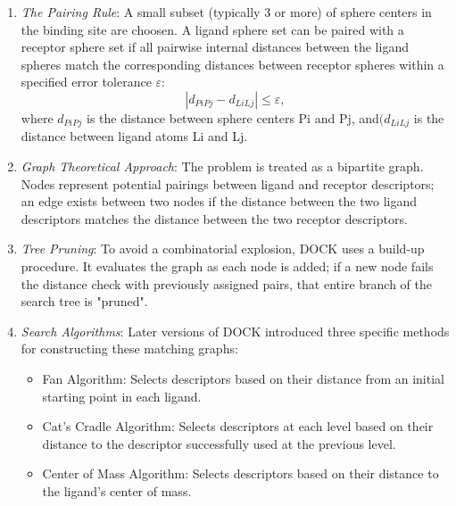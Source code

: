 \documentclass[12pt, a4paper]{article}
\begin{document}
\begin{enumerate}

  \item \textit{The Pairing Rule}: A small subset (typically 3 or more) of sphere centers in the binding site are choosen. A ligand sphere set can be paired with a receptor sphere set if all pairwise internal distances between the ligand spheres match the corresponding distances between receptor spheres within a specified error tolerance \(\varepsilon\):
        \[
          \left| d_{PiPj} - d_{LiLj} \right| \le \varepsilon,
        \]
        where $d_{PiPj}$ is the distance between sphere centers Pi and Pj, and$(d_{LiLj}$ is the distance between ligand atoms Li and Lj.
        
        \item \textit{Graph Theoretical Approach}: The problem is treated as a bipartite graph. Nodes represent potential pairings between ligand and receptor descriptors; an edge exists between two nodes if the distance between the two ligand descriptors matches the distance between the two receptor descriptors.
        
        \item \textit{Tree Pruning}: To avoid a combinatorial explosion, DOCK uses a build-up procedure. It evaluates the graph as each node is added; if a new node fails the distance check with previously assigned pairs, that entire branch of the search tree is "pruned".
      
       \item \textit{Search Algorithms}: Later versions of DOCK introduced three specific methods for constructing these matching graphs:
       
       \begin{itemize}
       \item Fan Algorithm: Selects descriptors based on their distance from an initial starting point in each ligand.
        \item Cat's Cradle Algorithm: Selects descriptors at each level based on their distance to the descriptor successfully used at the previous level.
        \item Center of Mass Algorithm: Selects descriptors based on their distance to the ligand's center of mass.
       \end{itemize}

\end{enumerate}
\end{document}
